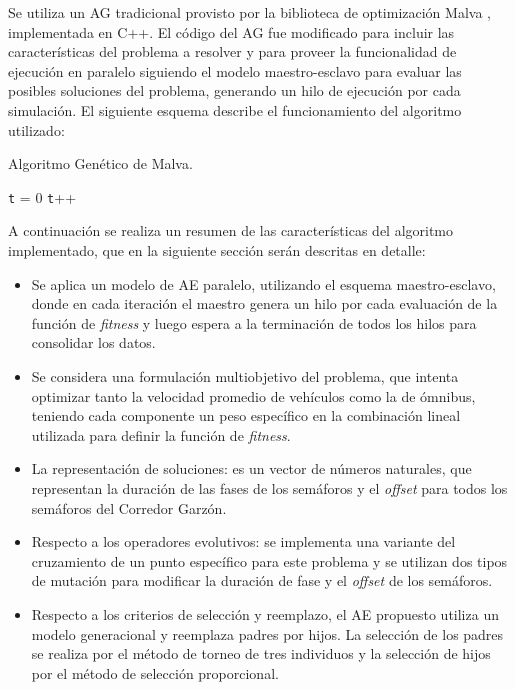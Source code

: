 Se utiliza un AG tradicional \citep{Goldberg1989} provisto por la biblioteca de optimización Malva \citep{Malva}, implementada en C++. El código del AG fue modificado para incluir las características del problema a resolver y para proveer la funcionalidad de ejecución en paralelo siguiendo el modelo maestro-esclavo para evaluar
las posibles soluciones del problema, generando un hilo de ejecución por cada simulación. El siguiente esquema describe el funcionamiento del algoritmo utilizado:

\begin{algorithm}[H]
	\caption{Algoritmo Genético de Malva. }
	\label{alg:algoritmo_genetico_malva}
	\begin{algorithmic} [1] 
		{
			\STATE \texttt{t} = 0
			\STATE \texttt{t}++		
			\ENDWHILE
		}
	\end{algorithmic}
	
\end{algorithm}

A continuación se realiza un resumen de las características del algoritmo implementado, que en la siguiente sección serán descritas en detalle:
\begin{itemize}
	
	\item Se aplica un modelo de AE paralelo, utilizando el esquema maestro-esclavo, donde en cada iteración el maestro genera un hilo por cada evaluación de la función de \emph{fitness} y luego espera a la terminación de todos los hilos para consolidar los datos. 
	\item Se considera una formulación multiobjetivo del problema, que intenta optimizar tanto la velocidad promedio de vehículos como la de ómnibus, teniendo cada componente un peso específico en la combinación lineal utilizada para definir la función de \emph{fitness}.
	\item La representación de soluciones: es un vector de números naturales, que representan la duración de las fases de los semáforos y el \emph{offset} para todos los semáforos del Corredor Garzón.
	\item Respecto a los operadores evolutivos: se implementa una variante del cruzamiento de un punto específico para este problema y se utilizan dos tipos de mutación para modificar la duración de fase y el \emph{offset} de los semáforos.
	\item Respecto a los criterios de selección y reemplazo, el AE propuesto utiliza un modelo generacional y reemplaza padres por hijos. La selección de los padres se realiza por el método de torneo de tres individuos y la selección de hijos por el método de selección proporcional.
	
\end{itemize}

